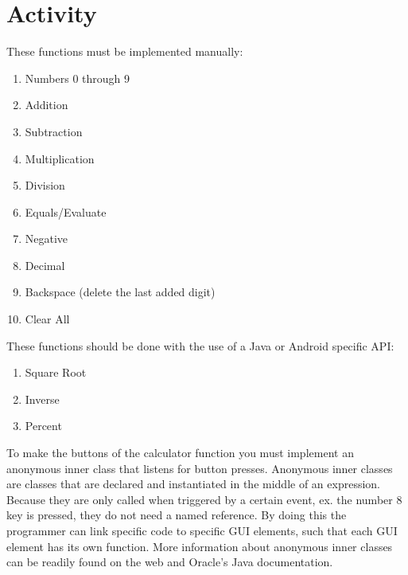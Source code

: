 \section{Activity}

These functions must be implemented manually:
\begin{enumerate}
\item Numbers 0 through 9
\item Addition
\item Subtraction
\item Multiplication
\item Division
\item Equals/Evaluate
\item Negative
\item Decimal
\item Backspace (delete the last added digit)
\item Clear All
\end{enumerate}

These functions should be done with the use of a Java or Android specific API:
\begin{enumerate}
\item Square Root
\item Inverse
\item Percent
\end{enumerate}

To make the buttons of the calculator function you must implement an anonymous inner class that listens for button presses.  Anonymous inner classes are classes that are declared and instantiated in the middle of an expression.  Because they are only called when triggered by a certain event, ex. the number 8 key is pressed, they do not need a named reference.  By doing this the programmer can link specific code to specific GUI elements, such that each GUI element has its own function.  More information about anonymous inner classes can be readily found on the web and Oracle's Java documentation.
